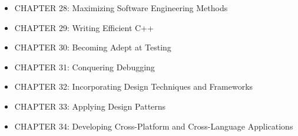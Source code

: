 \begin{itemize}
\item
CHAPTER 28: Maximizing Software Engineering Methods

\item
CHAPTER 29: Writing Efficient C++

\item
CHAPTER 30: Becoming Adept at Testing

\item
CHAPTER 31: Conquering Debugging

\item
CHAPTER 32: Incorporating Design Techniques and Frameworks

\item
CHAPTER 33: Applying Design Patterns

\item
CHAPTER 34: Developing Cross-Platform and Cross-Language Applications
\end{itemize}